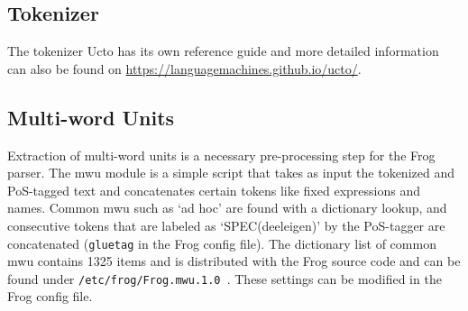 \documentclass{book}
\begin{document}


\subsection{Tokenizer}
\label{sec-bg-tok}

The tokenizer Ucto has its own reference guide \cite{UCTO} and more detailed information can also be found on \url{https://languagemachines.github.io/ucto/}.


\subsection{Multi-word Units}

Extraction of multi-word units is a necessary pre-processing step for the Frog parser.
The mwu module is a simple script that takes as input the tokenized and PoS-tagged text and concatenates certain tokens like fixed expressions and names. Common mwu such as `ad hoc' are found with a dictionary lookup, and consecutive tokens that are labeled as `SPEC(deeleigen)' by the PoS-tagger are concatenated ({\tt gluetag} in the Frog config file).
The dictionary list of common mwu contains 1325 items and is distributed with the Frog source code and can be found under {\tt /etc/frog/Frog.mwu.1.0 }. These settings can be modified in the Frog config file.

\end{document}
